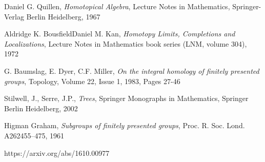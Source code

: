 \documentclass[14pt, dvipsnames]{extarticle}
\theoremstyle{definition}
\theoremstyle{remark}
\begin{document}
\begin{thebibliography}{}
Daniel G. Quillen, {\it Homotopical Algebra}, Lecture Notes in Mathematics, Springer-Verlag Berlin Heidelberg, 1967






Aldridge K. BousfieldDaniel M. Kan, {\it Homotopy Limits, Completions and Localizations},  Lecture Notes in Mathematics book series (LNM, volume 304), 1972





G. Baumslag, E. Dyer, C.F. Miller, {\it On the integral homology of finitely presented groups}, Topology, Volume 22, Issue 1, 1983, Pages 27-46



Stilwell, J., Serre, J.P., {\it Trees}, Springer Monographs in Mathematics, Springer Berlin Heidelberg, 2002



Higman Graham,  {\it Subgroups of finitely presented groups}, Proc. R. Soc. Lond. A262455–475, 1961


https://arxiv.org/abs/1610.00977






\end{thebibliography}
\end{document}
